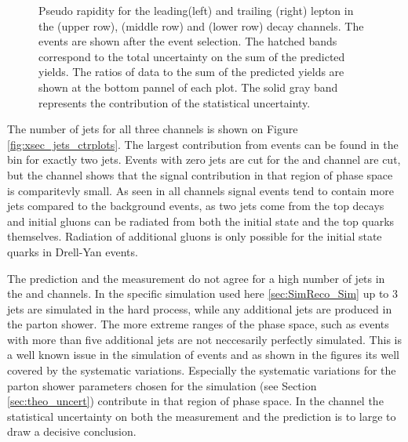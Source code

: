 \begin{figure}[htbp!]
\begin{center}
      \caption{Pseudo rapidity for the leading(left) and trailing (right)
        lepton in the \emu (upper row), \mumu (middle row) and \ee (lower row) decay channels.
        The events are shown after the
        event selection.  The hatched
        bands correspond to the total uncertainty on the sum of the
        predicted yields. 
        The ratios of data to the sum of the predicted yields are
        shown at the bottom pannel of each plot. The solid gray band
        represents the contribution of the statistical uncertainty.}  
       \label{fig:xsec_eta_ctrplots}
  \end{center}
\end{figure}



The number of jets for all three channels is shown on Figure \ref{fig:xsec_jets_ctrplots}.
The largest contribution from \ttbar events can be found in the bin for exactly two jets. 
Events with zero jets are cut for the \ee and \mumu channel are cut, but the \emu channel shows that the signal
contribution in that region of phase space is comparitevly small.
As seen in all channels \ttbar signal events tend to contain more jets compared to the background events, as two jets come from the top decays and initial gluons can be radiated from both the initial state and the top quarks themselves. 
Radiation of additional gluons is only possible for the initial state quarks in Drell-Yan events.

The prediction and the measurement do not agree for a high number of jets in the \emu and \mumu channels.
In the specific simulation used here \ref{sec:SimReco_Sim} up to 3 jets are simulated in the hard process, while any additional jets are produced in the parton shower.
The more extreme ranges of the phase space, such as events with more than five additional jets are not neccesarily perfectly simulated.
This is a well known issue in the simulation of \ttbar events and as shown in the figures its well covered by the systematic variations. Especially the systematic variations for the parton shower parameters chosen for the simulation
(see Section \ref{sec:theo_uncert}) contribute in that region of phase space.
In the \ee channel the statistical uncertainty on both the measurement and the prediction is to large to draw a decisive conclusion.

